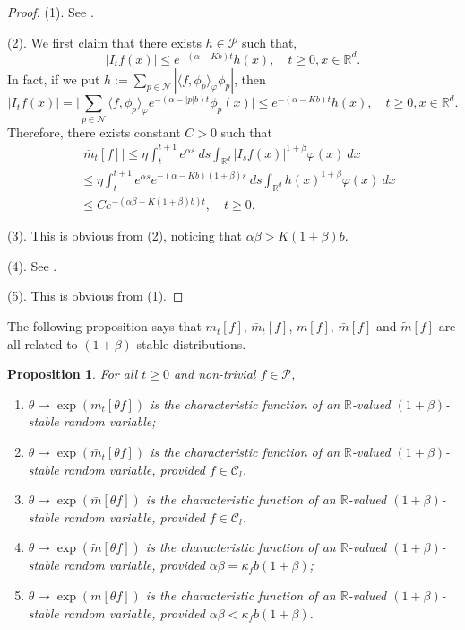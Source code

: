 \documentclass[12pt,a4paper]{amsart}
\theoremstyle{plain}
\newtheorem{prop}[thm]{Proposition}
\theoremstyle{definition}
\numberwithin{equation}{section}
\begin{document}
\begin{proof}
    (1). See \cite[Lemma 2.7]{MarksMilos2018CLT}.

    (2). We first claim that there exists $h\in \mathcal{P}$ such that,
\[
    \label{ineq: control of Itg}
    |I_tf(x)|
    \leq e^{-(\alpha-Kb)t}h(x),
    \quad t\geq 0, x\in \mathbb{R}^d. 
\]
    In fact, if we put $h:= \sum_{p\in \mathcal N} |\langle f,\phi_p\rangle_{\varphi}\phi_p|$, then
\begin{equation}
\label{eq: supper for Itf}
    |I_tf(x)|
    =\Big|\sum_{p\in\mathcal{N}} \langle f,\phi_p\rangle_{\varphi} e^{-(\alpha-|p|b)t}\phi_p(x)\Big|
    \leq e^{-(\alpha-Kb)t}h(x),
    \quad t\geq 0,x\in \mathbb{R}^d.
\end{equation}
    Therefore, there exists constant $C>0$ such that
\begin{align}
    &|\bar{m}_t[f]|
    \leq \eta \int_{t}^{t+1} e^{\alpha s}~ds \int_{\mathbb R^d} | I_sf(x)|^{1+\beta}\varphi(x)~dx
    \\&\leq \eta \int_{t}^{t+1} e^{\alpha s}e^{-(\alpha-Kb)(1+\beta)s}~ds\int_{\mathbb R^d} h(x)^{1+\beta}\varphi(x)~dx
    \\&\leq C e^{-(\alpha\beta-K(1+\beta)b)t},
    \quad t\geq 0.
\end{align}

    (3). This is obvious from (2), noticing that $\alpha\beta>K(1+\beta)b$.

    (4). See \cite[Lemma 4.2]{MarksMilos2018CLT}.

    (5). This is obvious from (1).
\end{proof}
    The following proposition says that $m_t[f]$, $\bar m_t[f]$, $m[f]$, $\bar m[f]$ and $\tilde m[f]$ are all related to $(1+\beta)$-stable distributions.
\begin{prop}
\label{prop: alpha stable rv}
	For all $t\geq 0$ and non-trivial $f\in \mathcal P$,
\begin{enumerate}
\item
\label{item: stable 1}
    $\theta \mapsto \exp(m_t[\theta f])$ is the characteristic function of an $\mathbb R$-valued $(1+\beta)$-stable random variable;
\item
\label{item: stable 2}
    $\theta \mapsto \exp(\bar{m}_t[\theta f])$ is the characteristic function of an $\mathbb R$-valued $(1+\beta)$-stable random variable, provided $f \in \mathcal C_l$.
\item
\label{item: stable 3}
   $\theta \mapsto \exp(\bar m[\theta f])$
    is the characteristic function of an $\mathbb R$-valued $(1+\beta)$-stable random variable, provided $f \in \mathcal C_l$.
\item
\label{item: stable 4}
    $\theta \mapsto \exp(\tilde m[\theta f])$ is the characteristic function of an $\mathbb R$-valued $(1+\beta)$-stable random variable, provided $\alpha\beta=\kappa_f b(1+\beta)$;
\item
\label{item: stable 5}
    $\theta \mapsto \exp(m[\theta f])$ is the characteristic function of an $\mathbb R$-valued $(1+\beta)$-stable random variable, provided $\alpha\beta < \kappa_f b(1+\beta)$.
\end{enumerate}
\end{prop}
\end{document}
